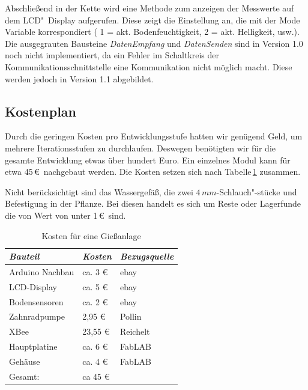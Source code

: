 Abschließend in der Kette wird eine Methode zum anzeigen der Messwerte auf dem LCD"~Display aufgerufen. Diese zeigt die Einstellung an, die mit der Mode Variable korrespondiert ( 1 = akt. Bodenfeuchtigkeit, 2 = akt.  Helligkeit, usw.). Die ausgegrauten Bausteine \emph{DatenEmpfang} und \emph{DatenSenden} sind in Version 1.0 noch nicht implementiert, da ein Fehler im Schaltkreis der Kommunikationsschnittstelle eine Kommunikation nicht möglich macht. Diese werden jedoch in Version 1.1 abgebildet.

	
\subsection{Kostenplan}
 Durch die geringen Kosten pro Entwicklungsstufe hatten wir genügend Geld, um mehrere Iterationsstufen  zu durchlaufen.
 Deswegen benötigten wir für die gesamte Entwicklung etwas über hundert Euro.
 Ein einzelnes Modul kann für etwa 45\,\euro\ nachgebaut werden. 
 Die Kosten setzen sich nach Tabelle\,\ref{Kosten für eine Giessanlage} zusammen.
 
 Nicht berücksichtigt sind das Wassergefäß, die zwei \begin{math}4\,mm\end{math}-Schlauch"-stücke und Befestigung in der Pflanze.
 Bei diesen handelt es sich um Reste oder Lagerfunde die von Wert von unter 1\,\euro\ sind. 
 
\begin{table}[ht]
	\centering
	\onehalfspacing
	\footnotesize
	\caption{Kosten für eine Gießanlage}
	\label{Kosten für eine Giessanlage}
		\begin{tabular}{|l|ll|}
			\hline
\textit{Bauteil} & \textit{Kosten} & \textit{Bezugsquelle} \\
\hline
Arduino Nachbau & ca. 3 \euro & ebay \\
LCD-Display & ca. 5 \euro & ebay\\
Bodensensoren & ca. 2 \euro & ebay \\
Zahnradpumpe & 2,95 \euro & Pollin \\
XBee &  23,55 \euro & Reichelt \\
Hauptplatine & ca. 6 \euro & FabLAB \\
Gehäuse	& ca. 4 \euro & FabLAB \\

\hline
Gesamt: & ca 45 \euro & \\
\hline
\end{tabular}
\end{table}
